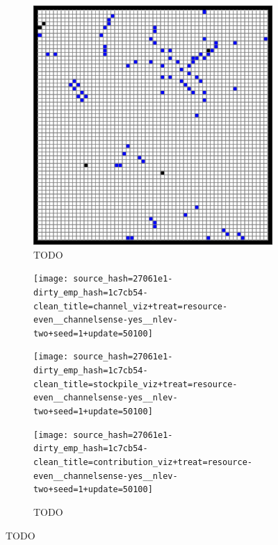 \begin{figure}[!htbp]
\begin{center}
\begin{subfigure}[b]{\textwidth}
\begin{minipage}{0.2\textwidth}
  \end{minipage}
  \begin{minipage}{0.2\textwidth}
  \includegraphics[width=\textwidth]{img/source_hash=27061e1-dirty_emp_hash=1c7cb54-clean_title=contribution_viz+treat=resource-even__channelsense-no__nlev-two+seed=1+update=50100}
  \end{minipage}
  \begin{minipage}{0.2\textwidth}
  \caption{TODO}
  \label{fig:TODO}
  \end{minipage}
\end{subfigure}

\begin{subfigure}[b]{\textwidth}
  \begin{minipage}{0.2\textwidth}
  \texttt{[image: source\_hash=27061e1-dirty\_emp\_hash=1c7cb54-clean\_title=channel\_viz+treat=resource-even\_\_channelsense-yes\_\_nlev-two+seed=1+update=50100]}
  \end{minipage}
  \begin{minipage}{0.2\textwidth}
  \texttt{[image: source\_hash=27061e1-dirty\_emp\_hash=1c7cb54-clean\_title=stockpile\_viz+treat=resource-even\_\_channelsense-yes\_\_nlev-two+seed=1+update=50100]}
  \end{minipage}
  \begin{minipage}{0.2\textwidth}
  \texttt{[image: source\_hash=27061e1-dirty\_emp\_hash=1c7cb54-clean\_title=contribution\_viz+treat=resource-even\_\_channelsense-yes\_\_nlev-two+seed=1+update=50100]}
  \end{minipage}
  \begin{minipage}{0.2\textwidth}
  \caption{TODO}
  \label{fig:TODO}
  \end{minipage}
\end{subfigure}


\end{center}
\end{figure}
